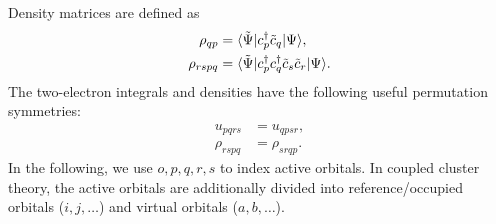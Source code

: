 \documentclass[aip,jcp,preprint,superscriptaddress,nofootinbib]{revtex4-1}
\begin{document}
Density matrices are defined as
\begin{align}
    \rho_{qp}   &= \langle \tilde{\Psi} \vert  c^{\dagger}_{p} \tilde{c}_{q}  \vert \Psi \rangle, \\
    \rho_{rspq} &= \langle \tilde{\Psi} \vert  c^{\dagger}_{p} c^{\dagger}_{q} \tilde{c}_{s} \tilde{c}_{r}  \vert \Psi \rangle.
\end{align}
The two-electron integrals and densities have the following useful permutation symmetries:
\begin{align}
    u_{pqrs}    &= u_{qpsr}, \\
    \rho_{rspq} &= \rho_{srqp}.
\end{align}
In the following, we use $o,p,q,r,s$ to index active orbitals. In coupled cluster
theory, the active orbitals are additionally divided into reference/occupied orbitals ($i,j,\ldots$)
and virtual orbitals ($a,b,\ldots$).
\end{document}
